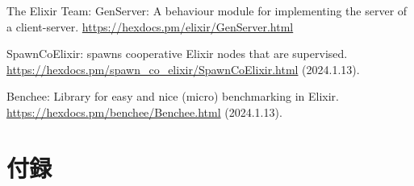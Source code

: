 \documentclass[a4paper]{jreport}	%
\begin{document}
\begin{thebibliography}{99}
The Elixir Team: GenServer: A behaviour module for implementing the server of a client-server. \url{https://hexdocs.pm/elixir/GenServer.html}  

SpawnCoElixir: spawns cooperative Elixir nodes that are supervised. \url{https://hexdocs.pm/spawn_co_elixir/SpawnCoElixir.html} (2024.1.13).

Benchee: Library for easy and nice (micro) benchmarking in Elixir.
\url{https://hexdocs.pm/benchee/Benchee.html} (2024.1.13).

\chapter*{付録}


\end{thebibliography}
\end{document}
